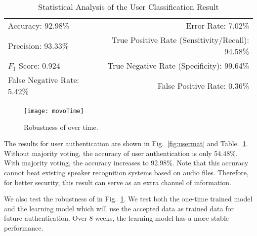\begin{table}[t]
	\caption{Statistical Analysis of the User Classification Result}
	\label{tab:userTable}
	\centering
	\begin{tabular}{lr}
		\toprule
		Accuracy: 92.98\% & \hspace{-.55in} Error Rate: 7.02\% \\
		Precision: 93.33\% & \hspace{-.55in} True Positive Rate (Sensitivity/Recall): 94.58\% \\
		$F_1$ Score: 0.924 & \hspace{-.55in} True Negative Rate (Specificity): 99.64\% \\
		False Negative Rate: 5.42\% & \hspace{-.55in} False Positive Rate: 0.36\% \\
		\bottomrule
	\end{tabular}
\end{table}



\begin{figure}[h]
	\centering
	\texttt{[image: movoTime]}
	\caption{Robustness of {\shortname} over time.}
	\label{fig:time}
\end{figure}



The results for user authentication are shown in Fig.~\ref{fig:usermat} and Table.~\ref{tab:userTable}. Without majority voting, the accuracy of user authentication is only 54.48\%. With majority voting, the accuracy increases to 92.98\%. Note that this accuracy cannot beat existing speaker recognition systems based on audio files. Therefore, for better security, this result can serve as an extra channel of information. 

We also test the robustness of {\shortname} in Fig.~\ref{fig:time}. We test both the one-time trained model and the learning model which will use the accepted data as trained data for future authentication. Over 8 weeks, the learning model has a more stable performance.




